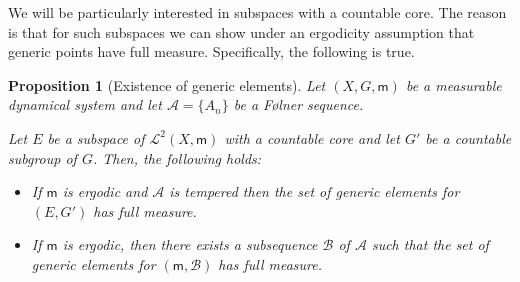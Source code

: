 \documentclass [14pt]{amsart}
\numberwithin{equation}{section}
\newcommand{\cA}{{\mathcal A}}
\newcommand{\cB}{{\mathcal B}}
\newcommand{\mm}{\mathsf{m}}
\newtheorem{prop}[theorem]{Proposition}
\begin{document}
We will be particularly interested in subspaces with  a countable core.  The reason is that for such subspaces we can show under an ergodicity assumption  that generic points have full measure.
Specifically, the following is true.







\begin{prop}[Existence of generic elements]\label{existence-generic} Let $(X,G, \mm)$ be  a measurable  dynamical system and let $\cA=\{A_n\}$ be a F\o lner sequence.

Let $E$ be a subspace of $\mathcal{L}^2 (X, \mm)$ with a countable core and let $G'$ be a countable subgroup of $G$.  Then, the following holds:

\begin{itemize}
\item[(a)]  If $\mm$ is ergodic and $\cA$ is tempered then the set of generic elements for $(E,G')$ has full measure.

\item[(b)] If $\mm$ is ergodic, then there exists a subsequence $\cB$ of $\cA$ such that the set of generic elements for $(\mm,\cB)$ has full measure.
\end{itemize}
\end{prop}
\end{document}
